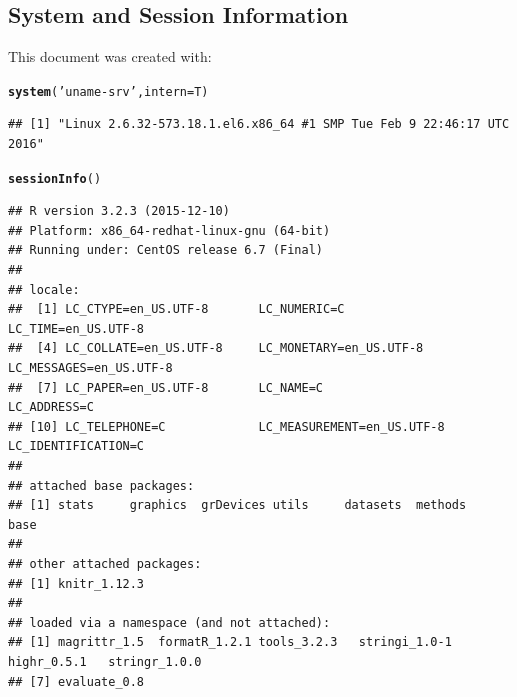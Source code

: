 \documentclass{article}\usepackage[]{graphicx}\usepackage[]{color}
\makeatletter
\newcommand{\hlstr}[1]{\textcolor[rgb]{0.192,0.494,0.8}{#1}}%
\newcommand{\hlstd}[1]{\textcolor[rgb]{0.345,0.345,0.345}{#1}}%
\newcommand{\hlkwc}[1]{\textcolor[rgb]{0.333,0.667,0.333}{#1}}%
\newcommand{\hlkwd}[1]{\textcolor[rgb]{0.737,0.353,0.396}{\textbf{#1}}}%
\newenvironment{kframe}{%
 \def\at@end@of@kframe{}%
 \ifinner\ifhmode%
  \def\at@end@of@kframe{\end{minipage}}%
  \begin{minipage}{\columnwidth}%
 \fi\fi%
 \def\FrameCommand##1{\hskip\@totalleftmargin \hskip-\fboxsep
 \colorbox{shadecolor}{##1}\hskip-\fboxsep
     \hskip-\linewidth \hskip-\@totalleftmargin \hskip\columnwidth}%
 \MakeFramed {\advance\hsize-\width
   \@totalleftmargin\z@ \linewidth\hsize
   \@setminipage}}%
 {\par\unskip\endMakeFramed%
 \at@end@of@kframe}
\newenvironment{knitrout}{}{} %
\makeatother
\begin{document}
\subsection{System and Session Information}\label{session}
This document was created with: \LaTeXe~ \fmtversion
\begin{knitrout}
\color{fgcolor}\begin{kframe}
\begin{alltt}
\hlkwd{system}\hlstd{(}\hlstr{'uname -srv'}\hlstd{,}\hlkwc{intern}\hlstd{=T)}
\end{alltt}
\begin{verbatim}
## [1] "Linux 2.6.32-573.18.1.el6.x86_64 #1 SMP Tue Feb 9 22:46:17 UTC 2016"
\end{verbatim}
\begin{alltt}
\hlkwd{sessionInfo}\hlstd{()}
\end{alltt}
\begin{verbatim}
## R version 3.2.3 (2015-12-10)
## Platform: x86_64-redhat-linux-gnu (64-bit)
## Running under: CentOS release 6.7 (Final)
## 
## locale:
##  [1] LC_CTYPE=en_US.UTF-8       LC_NUMERIC=C               LC_TIME=en_US.UTF-8       
##  [4] LC_COLLATE=en_US.UTF-8     LC_MONETARY=en_US.UTF-8    LC_MESSAGES=en_US.UTF-8   
##  [7] LC_PAPER=en_US.UTF-8       LC_NAME=C                  LC_ADDRESS=C              
## [10] LC_TELEPHONE=C             LC_MEASUREMENT=en_US.UTF-8 LC_IDENTIFICATION=C       
## 
## attached base packages:
## [1] stats     graphics  grDevices utils     datasets  methods   base     
## 
## other attached packages:
## [1] knitr_1.12.3
## 
## loaded via a namespace (and not attached):
## [1] magrittr_1.5  formatR_1.2.1 tools_3.2.3   stringi_1.0-1 highr_0.5.1   stringr_1.0.0
## [7] evaluate_0.8
\end{verbatim}
\end{kframe}
\end{knitrout}

\end{document}
